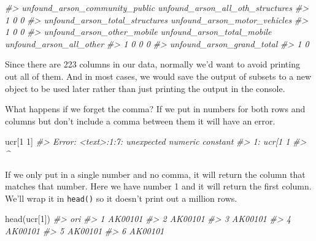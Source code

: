 \documentclass[
]{krantz}
\makeatletter
\newenvironment{Shaded}{\begin{snugshade}}{\end{snugshade}}
\newcommand{\CommentTok}[1]{\textcolor[rgb]{0.37,0.37,0.37}{\textit{#1}}}
\newcommand{\DecValTok}[1]{\textcolor[rgb]{0.06,0.06,0.06}{#1}}
\newcommand{\FunctionTok}[1]{\textcolor[rgb]{0,0,0}{#1}}
\newcommand{\NormalTok}[1]{#1}
\newenvironment{kframe}{%
\medskip{}
\setlength{\fboxsep}{.8em}
 \def\at@end@of@kframe{}%
 \ifinner\ifhmode%
  \def\at@end@of@kframe{\end{minipage}}%
  \begin{minipage}{\columnwidth}%
 \fi\fi%
 \def\FrameCommand##1{\hskip\@totalleftmargin \hskip-\fboxsep
 \colorbox{shadecolor}{##1}\hskip-\fboxsep
     \hskip-\linewidth \hskip-\@totalleftmargin \hskip\columnwidth}%
 \MakeFramed {\advance\hsize-\width
   \@totalleftmargin\z@ \linewidth\hsize
   \@setminipage}}%
 {\par\unskip\endMakeFramed%
 \at@end@of@kframe}
\renewenvironment{Shaded}{\begin{kframe}}{\end{kframe}}
\makeatother
\begin{document}
\begin{Shaded}
\begin{Highlighting}[]
\CommentTok{\#\textgreater{}   unfound\_arson\_community\_public unfound\_arson\_all\_oth\_structures}
\CommentTok{\#\textgreater{} 1                              0                                0}
\CommentTok{\#\textgreater{}   unfound\_arson\_total\_structures unfound\_arson\_motor\_vehicles}
\CommentTok{\#\textgreater{} 1                              0                            0}
\CommentTok{\#\textgreater{}   unfound\_arson\_other\_mobile unfound\_arson\_total\_mobile unfound\_arson\_all\_other}
\CommentTok{\#\textgreater{} 1                          0                          0                       0}
\CommentTok{\#\textgreater{}   unfound\_arson\_grand\_total}
\CommentTok{\#\textgreater{} 1                         0}
\end{Highlighting}
\end{Shaded}

Since there are 223 columns in our data, normally we'd want to avoid printing out all of them. And in most cases, we would save the output of subsets to a new object to be used later rather than just printing the output in the console.

What happens if we forget the comma? If we put in numbers for both rows and columns but don't include a comma between them it will have an error.

\begin{Shaded}
\begin{Highlighting}[]
\NormalTok{ucr[}\DecValTok{1} \DecValTok{1}\NormalTok{]}
\CommentTok{\#\textgreater{} Error: \textless{}text\textgreater{}:1:7: unexpected numeric constant}
\CommentTok{\#\textgreater{} 1: ucr[1 1}
\CommentTok{\#\textgreater{}           \^{}}
\end{Highlighting}
\end{Shaded}

If we only put in a single number and no comma, it will return the column that matches that number. Here we have number 1 and it will return the first column. We'll wrap it in \texttt{head()} so it doesn't print out a million rows.

\begin{Shaded}
\begin{Highlighting}[]
\FunctionTok{head}\NormalTok{(ucr[}\DecValTok{1}\NormalTok{])}
\CommentTok{\#\textgreater{}       ori}
\CommentTok{\#\textgreater{} 1 AK00101}
\CommentTok{\#\textgreater{} 2 AK00101}
\CommentTok{\#\textgreater{} 3 AK00101}
\CommentTok{\#\textgreater{} 4 AK00101}
\CommentTok{\#\textgreater{} 5 AK00101}
\CommentTok{\#\textgreater{} 6 AK00101}
\end{Highlighting}
\end{Shaded}
\end{document}
